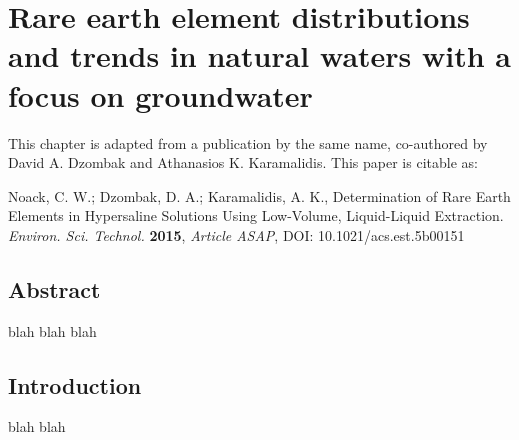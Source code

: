 \chapter{Rare earth element distributions and trends in natural waters with a focus on groundwater}

This chapter is adapted from a publication by the same name, co-authored by David A. Dzombak and Athanasios K. Karamalidis.
This paper is citable as: 

Noack, C. W.; Dzombak, D. A.; Karamalidis, A. K., Determination of Rare Earth Elements in Hypersaline Solutions Using Low-Volume, Liquid-Liquid Extraction. \textit{Environ. Sci. Technol.} \textbf{2015}, \textit{Article ASAP}, DOI: 10.1021/acs.est.5b00151

\clearpage

\section*{Abstract}
blah blah blah


\section{Introduction}

blah blah
